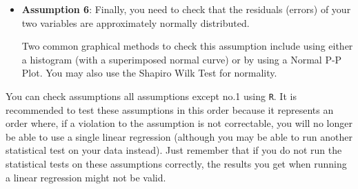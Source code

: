 \documentclass[]{report}
\begin{document}
\begin{itemize}
	\item \textbf{Assumption 6}: Finally, you need to check that the residuals (errors) of your two variables are approximately normally distributed.
	
	Two common graphical methods to check this assumption include using either a histogram (with a superimposed normal curve) or by using a Normal P-P Plot. You may also use the Shapiro Wilk Test for normality.
	
\end{itemize}

You can check assumptions all assumptions except no.1 using \texttt{R}. It is recommended to test these assumptions in this order because it represents an order where, if a violation to the assumption is not correctable, you will no longer be able to use a single linear regression (although you may be able to run another statistical test on your data instead). Just remember that if you do not run the statistical tests on these assumptions correctly, the results you get when running a linear regression might not be valid.
\end{document}
